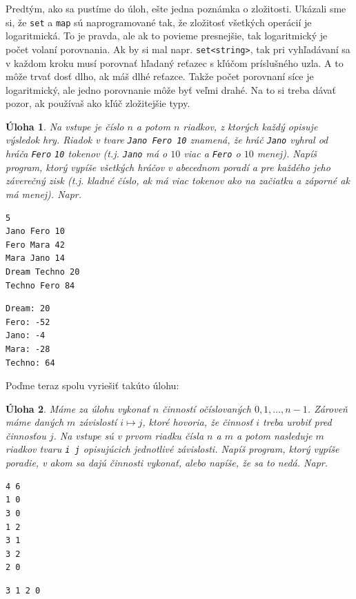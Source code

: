 \documentclass[10pt]{article}
\def\prg{\lstinline}
\def\ods{\vspace*{10pt}}
\newtheorem{uloha}{Úloha}
\def\bp{\begin{minipage}[t]{0.45\textwidth}\vspace{0pt}}
\def\ep{\end{minipage}}
\begin{document}
{\ods
Predtým, ako sa pustíme do úloh, ešte jedna poznámka o zložitosti. Ukázali sme si, že \prg!set! a 
\prg!map! sú naprogramované tak, že zložitosť všetkých operácií je logaritmická. To je pravda,
ale ak to povieme presnejšie, tak logaritmický je počet volaní porovnania. Ak by si mal
napr. \prg!set<string>!, tak pri vyhľadávaní
sa v každom kroku musí porovnať hľadaný reťazec s kľúčom príslušného uzla. A to môže trvať
dosť dlho, ak máš dlhé reťazce. Takže počet porovnaní síce je logaritmický, ale jedno porovnanie
môže byť veľmi drahé. Na to si treba dávať pozor, ak používaš ako kľúč zložitejšie typy.

\begin{uloha}
  Na vstupe je číslo $n$ a potom $n$ riadkov, z ktorých každý opisuje výsledok hry.
  Riadok v tvare {\tt Jano Fero 10} znamená, že hráč {\tt Jano} vyhral od hráča {\tt Fero}
  {\tt 10} tokenov (t.j. {\tt Jano} má o $10$ viac a {\tt Fero} o $10$ menej).
  Napíš program, ktorý vypíše všetkých hráčov v abecednom poradí a pre každého jeho
  záverečný zisk (t.j. kladné číslo, ak má viac tokenov ako na začiatku a záporné
  ak má menej). Napr.

\ods
\bp
\begin{verbatim}
5
Jano Fero 10
Fero Mara 42
Mara Jano 14
Dream Techno 20
Techno Fero 84
\end{verbatim}
\ep\hfill\bp
\begin{verbatim}
Dream: 20
Fero: -52
Jano: -4
Mara: -28
Techno: 64
\end{verbatim}
\ep
\end{uloha}

\ods
Poďme teraz spolu vyriešiť takúto úlohu:

\begin{uloha}
Máme za úlohu vykonať $n$ činností očíslovaných $0,1,\ldots,n-1$. Zároveň máme daných
  $m$ závislostí $i\mapsto j$, ktoré hovoria, že činnosť $i$ treba urobiť pred činnosťou 
  $j$. Na vstupe sú v prvom riadku čísla $n$ a $m$ a potom nasleduje $m$ riadkov 
  tvaru {\tt i j} opisujúcich jednotlivé závislosti. Napíš program, ktorý vypíše poradie,
  v akom sa dajú činnosti vykonať, alebo napíše, že sa to nedá. Napr.

\ods
  \def\nd(#1)#2{
     \filldraw[thick, fill=yellow!10!white] (#1) node {{\tt #2}} circle (2ex);
   }
   \def\lnk(#1,#2)#3{
    \draw [->, shorten >= 2.4ex] (n#1) to[out=#3,in=180-#3] (n#2);
   }
\begin{minipage}[t]{0.2\textwidth}\vspace{0pt}
\begin{verbatim}
4 6
1 0
3 0
1 2
3 1
3 2
2 0
\end{verbatim}
\end{minipage}\begin{minipage}[t]{0.8\textwidth}\vspace{0pt}
\begin{verbatim}
3 1 2 0 
\end{verbatim}


\end{minipage}
\end{uloha}}
\end{document}

